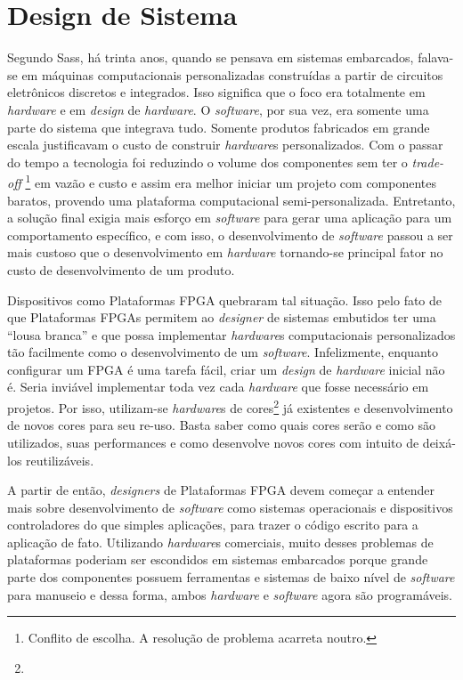 \chapter{Design de Sistema} \label{chap:introducao}

Segundo Sass, há trinta anos, quando se pensava em sistemas embarcados, falava-se em máquinas computacionais personalizadas construídas a partir de circuitos eletrônicos discretos e integrados. Isso significa que o foco era totalmente em \textit{hardware} e em \textit{design} de \textit{hardware}. O \textit{software}, por sua vez, era somente uma parte do sistema que integrava tudo. Somente produtos fabricados em grande escala justificavam o custo de construir \textit{hardware}s personalizados. Com o passar do tempo a tecnologia foi reduzindo o volume dos componentes sem ter o \textit{trade-off} \footnote{Conflito de escolha. A resolução de problema acarreta noutro.} em vazão e custo e assim era melhor iniciar um projeto com componentes baratos, provendo uma plataforma computacional semi-personalizada. Entretanto, a solução final exigia mais esforço em \textit{software} para gerar uma aplicação para um comportamento específico, e com isso, o desenvolvimento de \textit{software} passou a ser mais custoso que o desenvolvimento em \textit{hardware} tornando-se principal fator no custo de desenvolvimento de um produto.

Dispositivos como Plataformas FPGA quebraram tal situação. Isso pelo fato de que Plataformas FPGAs permitem ao \textit{\textit{design}er} de sistemas embutidos ter uma “lousa branca” e que possa implementar \textit{hardware}s computacionais personalizados tão facilmente como o desenvolvimento de um \textit{software}. Infelizmente, enquanto configurar um FPGA é uma tarefa fácil, criar um \textit{design} de \textit{hardware} inicial não é. Seria inviável implementar toda vez cada \textit{hardware} que fosse necessário em projetos. Por isso, utilizam-se \textit{hardware}s de cores\footnote{} já existentes e desenvolvimento de novos cores para seu re-uso. Basta saber como quais cores serão e como são utilizados, suas performances e como desenvolve novos cores com intuito de deixá-los reutilizáveis.

A partir de então, \textit{\textit{\textit{design}er}s} de Plataformas FPGA devem começar a entender mais sobre desenvolvimento de \textit{software} como sistemas operacionais e dispositivos controladores do que simples aplicações, para trazer o código escrito para a aplicação de fato. Utilizando \textit{hardware}s comerciais, muito desses problemas de plataformas poderiam ser escondidos em sistemas embarcados porque grande parte dos componentes possuem ferramentas e sistemas de baixo nível de \textit{software} para manuseio e dessa forma, ambos \textit{hardware} e \textit{software} agora são programáveis.



